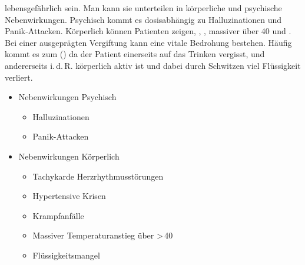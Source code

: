 {%
lebensgefährlich sein. Man kann sie unterteilen in
körperliche und psychische Nebenwirkungen.
Psychisch kommt es dosisabhängig zu Halluzinationen und
Panik-Attacken.
Körperlich können Patienten  zeigen, ,
, massiver
 über 40\textdegree{} und
.
Bei einer ausgeprägten Vergiftung kann eine vitale Bedrohung
bestehen. Häufig kommt es zum
() da der
Patient einerseits auf das Trinken vergisst, und
andererseits i.\,d.\,R. körperlich aktiv ist und dabei durch
Schwitzen viel Flüssigkeit verliert.

\vspace{1.5cm}

}{
\begin{itemize}
  \item Nebenwirkungen Psychisch
  \begin{itemize}
    \item Halluzinationen
    \item Panik-Attacken
  \end{itemize}
  \item Nebenwirkungen Körperlich
  \begin{itemize}
    \item Tachykarde Herzrhythmusstörungen
    \item Hypertensive Krisen
    \item Krampfanfälle
    \item Massiver Temperaturanstieg über
    {\textgreater}\,40\DegC*
    \item Flüssigkeitsmangel
  \end{itemize}
\end{itemize}
}{}{}{}




\cite{Supady2009}








